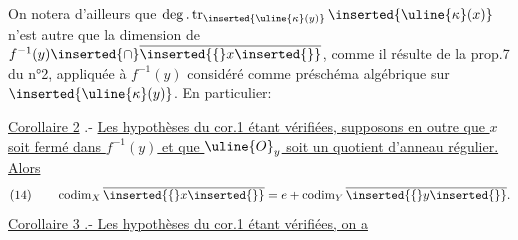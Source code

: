 On notera d'ailleurs que $\deg.\operatorname{tr}_{\inserted{\uline{\kappa}(y)}}\inserted{\uline{\kappa}(x)}$ n'est autre que la dimension de $f^{-1}(y)\inserted{\cap}\overline{\inserted{\{}x\inserted{\}}}$, comme il résulte de la prop.7 du n°2, appliquée à $f^{-1}(y)$ considéré comme préschéma algébrique sur $\inserted{\uline{\kappa}(y)}$. En particulier:

\uline{Corollaire 2} .-  \uline{Les hypothèses du cor.1 étant vérifiées, supposons en outre que $x$ soit fermé dans $f^{-1}(y)$ et que $\uline{O}_y$ soit un quotient d'anneau régulier. Alors}
\[
(14)\qquad\operatorname{codim}_X\overline{\inserted{\{}x\inserted{\}}}=e+\operatorname{codim}_Y\overline{\inserted{\{}y\inserted{\}}}.
\]
\uline{Corollaire 3 .- Les hypothèses du cor.1 étant vérifiées, on a}
